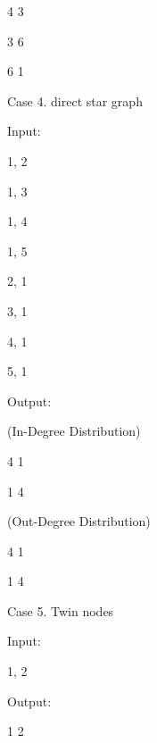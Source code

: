 \begin{itemize*}
4	3

3	6

6	1

\item{Case 4. direct star graph}

Input:

1, 2

1, 3

1, 4

1, 5

2, 1

3, 1

4, 1

5, 1

Output:

(In-Degree Distribution)

4	1

1	4

(Out-Degree Distribution)

4	1

1	4

\item{Case 5. Twin nodes}

Input:

1, 2

Output:

1	2
\end{itemize*}

